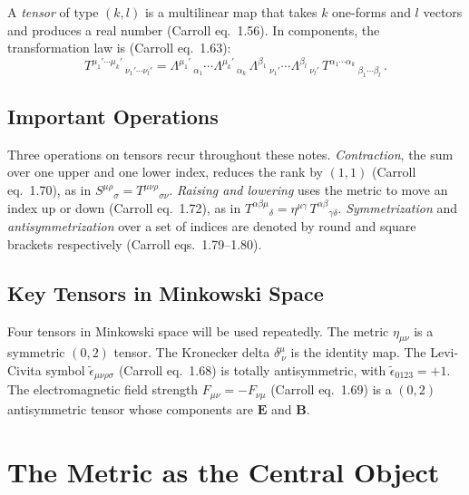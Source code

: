 A \emph{tensor} of type $(k, l)$ is a multilinear map that takes $k$
one-forms and $l$ vectors and produces a real number (Carroll eq.~1.56).
In components, the transformation law is (Carroll eq.~1.63):
\begin{equation}
    T^{\mu_1'\cdots\mu_k'}{}_{\ \nu_1'\cdots\nu_l'}
    = \Lambda^{\mu_1'}{}_{\ \alpha_1} \cdots \Lambda^{\mu_k'}{}_{\ \alpha_k}\,
      \Lambda^{\beta_1}{}_{\ \nu_1'} \cdots \Lambda^{\beta_l}{}_{\ \nu_l'}\,
      T^{\alpha_1\cdots\alpha_k}{}_{\ \beta_1\cdots\beta_l} \,.
    \label{eq:tensor_transform}
\end{equation}

\subsection{Important Operations}

Three operations on tensors recur throughout these notes.
\emph{Contraction}, the sum over one upper and one lower index,
reduces the rank by $(1,1)$ (Carroll eq.~1.70), as in
$S^{\mu\rho}{}_\sigma = T^{\mu\nu\rho}{}_{\sigma\nu}$.
\emph{Raising and lowering} uses the metric to move an index up or down
(Carroll eq.~1.72), as in
$T^{\alpha\beta\mu}{}_\delta = \eta^{\mu\gamma}\,
T^{\alpha\beta}{}_{\gamma\delta}$.
\emph{Symmetrization} and \emph{antisymmetrization} over a set of indices
are denoted by round and square brackets respectively
(Carroll eqs.~1.79--1.80).

\subsection{Key Tensors in Minkowski Space}

Four tensors in Minkowski space will be used repeatedly.
The metric $\eta_{\mu\nu}$ is a symmetric $(0,2)$ tensor.
The Kronecker delta $\delta^\mu_{\ \nu}$ is the identity map.
The Levi-Civita symbol $\tilde{\epsilon}_{\mu\nu\rho\sigma}$
(Carroll eq.~1.68) is totally antisymmetric, with
$\tilde{\epsilon}_{0123} = +1$.
The electromagnetic field strength
$F_{\mu\nu} = -F_{\nu\mu}$ (Carroll eq.~1.69) is a $(0,2)$
antisymmetric tensor whose components are $\mathbf{E}$ and $\mathbf{B}$.


\section{The Metric as the Central Object}
\label{sec:metric_central}

